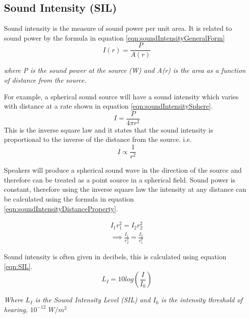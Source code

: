 \documentclass[12pt, a4paper]{article}
\begin{document}
	\subsection{Sound Intensity (SIL)}
	Sound intensity is the measure of sound power per unit area. It is related to sound power by the formula in equation \ref{eqn:soundIntensityGeneralForm}\cite{soundIntensity}
	\begin{equation}
		\label{eqn:soundIntensityGeneralForm}
		I(r) = \frac{P}{A(r)}
	\end{equation}
	\begin{center}
		\textit{where P is the sound power at the source (W) and A(r) is the area as a function of distance from the source.}
	\end{center}
	For example, a spherical sound source will have a sound intensity which varies with distance at a rate shown in equation \ref{eqn:soundIntensitySphere}.
	\begin{equation}	
		\label{eqn:soundIntensitySphere}
		I = \frac{P}{4\pi r^2}
	\end{equation}
	This is the inverse square law and it states that the sound intensity is proportional to the inverse of the distance from the source. i.e.
	\begin{equation*}
		I \propto \frac{1}{r^2}
	\end{equation*}
	
	Speakers will produce a spherical sound wave in the direction of the source and therefore can be treated as a point source in a spherical field. Sound power is constant, therefore using the inverse square law the intensity at any distance can be calculated using the formula in equation \ref{eqn:soundIntensityDistanceProperty}. \cite{audioParameters} 
	
	\begin{equation}	
		\begin{aligned}
		\label{eqn:soundIntensityDistanceProperty}
		I_1r_1^2 = I_2r_2^2 \\
		\implies \frac{I_1}{r_2^2} = \frac{I_2}{r_1^2}
		\end{aligned}
	\end{equation}
	
	Sound intensity is often given in decibels, this is calculated using equation \ref{eqn:SIL}.
	\begin{equation}
		\label{eqn:SIL}
		L_I = 10log\left(\frac{I}{I_0}\right)
	\end{equation}
	\begin{center}
		\textit{Where $L_I$ is the Sound Intensity Level (SIL) and $I_0$ is the intensity threshold of hearing, $10^{-12}$ $W/m^2$} 
	\end{center}
\end{document}
